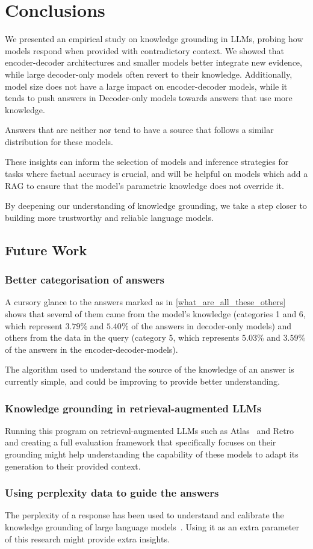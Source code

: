 \section{Conclusions}

We presented an empirical study on knowledge grounding in LLMs, probing how models respond when provided with contradictory context.
We showed that encoder-decoder architectures and smaller models better integrate new evidence, while large decoder-only models often revert to their \Parametric{} knowledge.  Additionally, model size does not have a large impact on encoder-decoder models, while it tends to push answers in Decoder-only models towards answers that use more \Parametric{} knowledge.

Answers that are neither \Parametric{} nor \Contextual{} tend to have a source that follows a similar distribution for these models.

These insights can inform the selection of models and inference strategies for tasks where factual accuracy is crucial, and will be helpful on models which add a RAG to ensure that the model's parametric knowledge does not override it.

By deepening our understanding of knowledge grounding, we take a step closer to building more trustworthy and reliable language models.

\subsection{Future Work}

\subsubsection{Better categorisation of \Other{} answers}
A cursory glance to the answers marked as \Other{} in \cref{what_are_all_these_others} shows that several of them came from the model's \Parametric{} knowledge (categories 1 and 6, which represent $3.79\%$ and $5.40\%$ of the answers in decoder-only models) and others from the \Contextual{} data in the query (category 5, which represents $5.03\%$ and $3.59\%$ of the answers in the encoder-decoder-models).

The algorithm used to understand the source of the knowledge of an answer is currently simple, and could be improving to provide better understanding.

\subsubsection{Knowledge grounding in retrieval-augmented LLMs}
Running this program on retrieval-augmented LLMs such as Atlas~\cite{atlas_foundational} and Retro~\cite{retro} and creating a full evaluation framework that specifically focuses on their grounding might help understanding the capability of these models to adapt its generation to their provided context.

\subsubsection{Using perplexity data to guide the answers}
The perplexity of a response has been used to understand and calibrate the knowledge grounding of large language models~\cite{how_can_we_know}.
Using it as an extra parameter of this research might provide extra insights.
